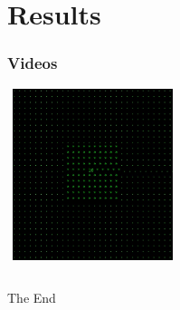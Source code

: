 \documentclass[xcolor={dvipsnames}]{beamer}
\begin{document}
\section{Results}
\begin{frame}
\end{frame}


\begin{frame}
\frametitle{Videos}
\centerline{\includegraphics[width=5cm, height=5cm]{images/startvideo.png}}
\vspace{.75cm}
\begin{columns}[c] %
\centerline{}
\centerline{}
\end{columns}
\end{frame}


\begin{frame}
\Huge{\centerline{The End}}
\end{frame}

\end{document}
